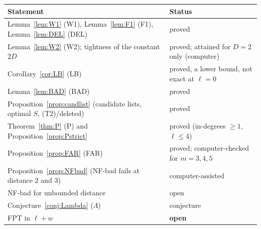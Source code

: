 \begin{center}
\begin{tabular}{@{}ll@{}}
\hline
Statement & Status\\
\hline
Lemma~\ref{lem:W1} (W1), Lemma~\ref{lem:F1} (F1), Lemma~\ref{lem:DEL} (DEL) & proved\\
Lemma~\ref{lem:W2} (W2); tightness of the constant $2D$ & proved; attained for $D=2$ only (computer)\\
Corollary~\ref{cor:LB} (LB) & proved, a lower bound, not exact at $\ell=0$\\
Lemma~\ref{lem:BAD} (BAD) & proved\\
Proposition~\ref{prop:candlist} (candidate lists, optimal $S$, (T2)/deleted) & proved\\
Theorem~\ref{thm:P} (P) and Proposition~\ref{prop:Pstrict} & proved (in-degrees $\ge1$, $\ell\le4$)\\
Proposition~\ref{prop:FAR} (FAR) & proved; computer-checked for $m=3,4,5$\\
Proposition~\ref{prop:NFbad} (NF-bad fails at distance $2$ and $3$) & computer-assisted\\
NF-bad for unbounded distance & open\\
Conjecture~\ref{conj:Lambda} ($\Lambda$) & conjecture\\
FPT in $\ell+w$ & \textbf{open}\\
\hline
\end{tabular}
\end{center}
